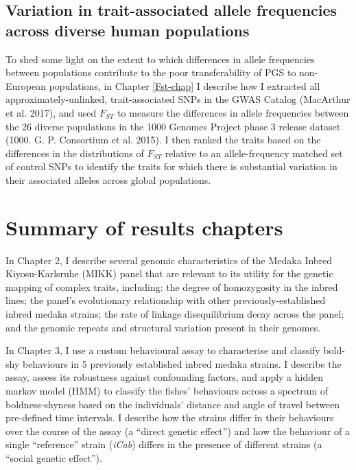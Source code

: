 \documentclass[
]{book}
\begin{document}
\hypertarget{variation-in-trait-associated-allele-frequencies-across-diverse-human-populations}{%
\subsection{Variation in trait-associated allele frequencies across diverse human populations}\label{variation-in-trait-associated-allele-frequencies-across-diverse-human-populations}}

To shed some light on the extent to which differences in allele frequencies between populations contribute to the poor transferability of PGS to non-European populations, in Chapter \ref{Fst-chap} I describe how I extracted all approximately-unlinked, trait-associated SNPs in the GWAS Catalog (MacArthur et al. 2017), and used \(F_{ST}\) to measure the differences in allele frequencies between the 26 diverse populations in the 1000 Genomes Project phase 3 release dataset (1000. G. P. Consortium et al. 2015). I then ranked the traits based on the differences in the distributions of \(F_{ST}\) relative to an allele-frequency matched set of control SNPs to identify the traits for which there is substantial variation in their associated alleles across global populations.

\hypertarget{summary-of-results-chapters}{%
\section{Summary of results chapters}\label{summary-of-results-chapters}}

In Chapter 2, I describe several genomic characteristics of the Medaka Inbred Kiyosu-Karlsruhe (MIKK) panel that are relevant to its utility for the genetic mapping of complex traits, including: the degree of homozygosity in the inbred lines; the panel's evolutionary relationship with other previously-established inbred medaka strains; the rate of linkage disequilibrium decay across the panel; and the genomic repeats and structural variation present in their genomes.

In Chapter 3, I use a custom behavioural assay to characterise and classify bold-shy behaviours in 5 previously established inbred medaka strains. I describe the assay, assess its robustness against confounding factors, and apply a hidden markov model (HMM) to classify the fishes' behaviours across a spectrum of boldness-shyness based on the individuals' distance and angle of travel between pre-defined time intervals. I describe how the strains differ in their behaviours over the course of the assay (a ``direct genetic effect'') and how the behaviour of a single ``reference'' strain (\emph{iCab}) differs in the presence of different strains (a ``social genetic effect'').
\end{document}
